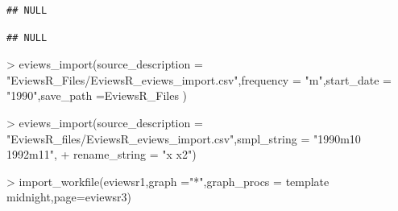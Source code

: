 \documentclass[
]{article}
\newenvironment{Shaded}{\begin{snugshade}}{\end{snugshade}}
\newcommand{\AttributeTok}[1]{\textcolor[rgb]{0.77,0.63,0.00}{#1}}
\newcommand{\FunctionTok}[1]{\textcolor[rgb]{0.00,0.00,0.00}{#1}}
\newcommand{\NormalTok}[1]{#1}
\newcommand{\SpecialCharTok}[1]{\textcolor[rgb]{0.00,0.00,0.00}{#1}}
\newcommand{\StringTok}[1]{\textcolor[rgb]{0.31,0.60,0.02}{#1}}
\begin{document}
\begin{verbatim}
## NULL
\end{verbatim}

\begin{Shaded}
\end{Shaded}

\begin{verbatim}
## NULL
\end{verbatim}

\begin{Shaded}
\begin{Highlighting}[]
\SpecialCharTok{\textgreater{}} \FunctionTok{eviews\_import}\NormalTok{(}\AttributeTok{source\_description =} \StringTok{"EviewsR\_Files/EviewsR\_eviews\_import.csv"}\NormalTok{,}\AttributeTok{frequency =} \StringTok{"m"}\NormalTok{,}\AttributeTok{start\_date =} \StringTok{"1990"}\NormalTok{,}\AttributeTok{save\_path =}\StringTok{\textquotesingle{}EviewsR\_Files\textquotesingle{}}\NormalTok{ )}
\end{Highlighting}
\end{Shaded}

\begin{Shaded}
\begin{Highlighting}[]
\SpecialCharTok{\textgreater{}} \FunctionTok{eviews\_import}\NormalTok{(}\AttributeTok{source\_description =} \StringTok{"EviewsR\_files/EviewsR\_eviews\_import.csv"}\NormalTok{,}\AttributeTok{smpl\_string =} \StringTok{"1990m10 1992m11"}\NormalTok{,}
\SpecialCharTok{+} \AttributeTok{rename\_string =} \StringTok{"x x2"}\NormalTok{)}
\end{Highlighting}
\end{Shaded}

\begin{Shaded}
\begin{Highlighting}[]
\SpecialCharTok{\textgreater{}} \FunctionTok{import\_workfile}\NormalTok{(}\StringTok{\textquotesingle{}eviewsr1\textquotesingle{}}\NormalTok{,}\AttributeTok{graph =}\StringTok{"*"}\NormalTok{,}\AttributeTok{graph\_procs =} \StringTok{\textquotesingle{}template midnight\textquotesingle{}}\NormalTok{,}\AttributeTok{page=}\StringTok{\textquotesingle{}eviewsr3\textquotesingle{}}\NormalTok{)}
\end{Highlighting}
\end{Shaded}
\end{document}
